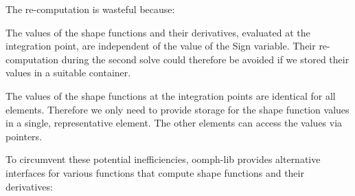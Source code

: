 The re-\/computation is wasteful because\+:
\begin{DoxyItemize}
\item The values of the shape functions and their derivatives, evaluated at the integration point, are independent of the value of the {\ttfamily Sign} variable. Their re-\/computation during the second solve could therefore be avoided if we stored their values in a suitable container.
\item The values of the shape functions at the integration points are identical for all elements. Therefore we only need to provide storage for the shape function values in a single, representative element. The other elements can access the values via pointers.
\end{DoxyItemize}To circumvent these potential inefficiencies, {\ttfamily oomph-\/lib} provides alternative interfaces for various functions that compute shape functions and their derivatives\+:
